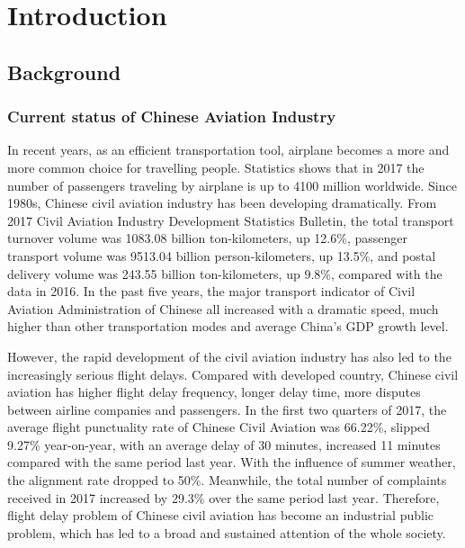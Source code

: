 \documentclass[senior]{IPSstyle}
\begin{document}
 \makepreliminarypages
 \singlespace
 \frontmatter
 \tableofcontents
 \listoffigures
 \listoftables
 \mainmatter
 \clearemptydoublepage
 \setlength{\baselineskip}{23.0pt}

\chapter{Introduction} \label{introduction}



\section{Background}

\subsection{Current status of Chinese Aviation Industry}
In recent years, as an efficient transportation tool, airplane becomes a more and more common choice for travelling people. Statistics shows that in 2017 the number of passengers traveling by airplane is up to 4100 million worldwide. 
Since 1980s, Chinese civil aviation industry has been developing dramatically. 
From 2017 Civil Aviation Industry Development Statistics Bulletin\cite{timmurphy.org}, the total transport turnover volume was 1083.08 billion ton-kilometers, up 12.6\%, passenger transport volume was 9513.04 billion person-kilometers, up 13.5\%, and postal delivery volume was 243.55 billion ton-kilometers, up 9.8\%, compared with the data in 2016. 
In the past five years, the major transport indicator of Civil Aviation Administration of Chinese all increased with a dramatic speed, much higher than other transportation modes and average China's GDP growth level.

However, the rapid development of the civil aviation industry has also led to the increasingly serious flight delays.
Compared with developed country, Chinese civil aviation has higher flight delay frequency, longer delay time, more disputes between airline companies and passengers.
In the first two quarters of 2017, the average flight punctuality rate of Chinese Civil Aviation was 66.22\%, slipped 9.27\% year-on-year, with an average delay of 30 minutes, increased 11 minutes compared with the same period last year. With the influence of summer weather, the alignment rate dropped to 50\%.
Meanwhile, the total number of complaints received in 2017 increased by 29.3\% over the same period last year.
Therefore, flight delay problem of Chinese civil aviation has become an industrial public problem, which has led to a broad and sustained attention of the whole society.
\end{document}
